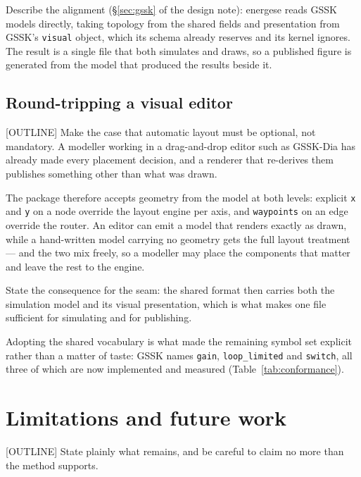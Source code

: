 Describe the alignment (\S\ref{sec:gssk} of the design note): energese reads
GSSK models directly, taking topology from the shared fields and presentation
from GSSK's \texttt{visual} object, which its schema already reserves and its
kernel ignores. The result is a single file that both simulates and draws, so a
published figure is generated from the model that produced the results beside
it.

\subsection{Round-tripping a visual editor}
\label{sec:roundtrip}

[OUTLINE] Make the case that automatic layout must be optional, not mandatory.
A modeller working in a drag-and-drop editor such as GSSK-Dia has already made
every placement decision, and a renderer that re-derives them publishes
something other than what was drawn.

The package therefore accepts geometry from the model at both levels: explicit
\texttt{x} and \texttt{y} on a node override the layout engine per axis, and
\texttt{waypoints} on an edge override the router. An editor can emit a model
that renders exactly as drawn, while a hand-written model carrying no geometry
gets the full layout treatment --- and the two mix freely, so a modeller may
place the components that matter and leave the rest to the engine.

State the consequence for the seam: the shared format then carries both the
simulation model and its visual presentation, which is what makes one file
sufficient for simulating and for publishing.

Adopting the shared vocabulary is what made the remaining symbol set explicit
rather than a matter of taste: GSSK names \texttt{gain}, \texttt{loop\_limited}
and \texttt{switch}, all three of which are now implemented and measured
(Table~\ref{tab:conformance}).

\section{Limitations and future work}
\label{sec:limits}

[OUTLINE] State plainly what remains, and be careful to claim no more than the
method supports.

